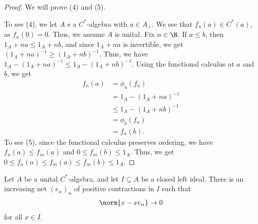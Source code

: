 \documentclass[10pt]{mypackage}
\begin{document}
\begin{proof}
  We will prove (4) and (5).\newline

  To see (4), we let $A$ e a $C^{\ast}$-algebra with $a\in A_{+}$. We see that $f_n\left(a\right) \in C^{\ast}\left(a\right)$, as $f_n(0) = 0$. Thus, we assume $A$ is unital. Fix $n\in \N$. If $a \leq b$, then $1_A + na \leq 1_A + nb$, and since $1_A + na$ is invertible, we get $\left(1_A + na\right)^{-1}\geq \left(1_A + nb\right)^{-1}$. Thus, we have $1_A - \left(1_A  +na\right)^{-1}\leq 1_A - \left(1_A + nb\right)^{-1}$. Using the functional calculus at $a$ and $b$, we get
  \begin{align*}
    f_n\left(a\right) &= \phi_a\left(f_n\right)\\
                      &= 1_A - \left(1_A + na\right)^{-1}\\
                      &\leq 1_A - \left(1_A + nb\right)^{-1}\\
                      &= \phi_b\left(f_n\right)\\
                      &= f_n\left(b\right).
  \end{align*}
  To see (5), since the functional calculus preserves ordering, we have $f_n\left(a\right)\leq f_m\left(a\right)$ and $0 \leq f_m\left(b\right) \leq 1_A$. Thus, we get $0 \leq f_n\left(a\right)\leq f_m\left(a\right)\leq f_m\left(b\right)\leq 1_A$.
\end{proof}
\begin{proposition}
  Let $A$ be a unital $C^{\ast}$-algebra, and let $I\subseteq A$ be a closed left ideal. There is an increasing net $\left(e_{\alpha}\right)_{\alpha}$ of positive contractions in $I$ such that
  \begin{align*}
    \norm{x - xe_{\alpha}}\rightarrow 0
  \end{align*}
  for all $x\in I$.
\end{proposition}
\end{document}
